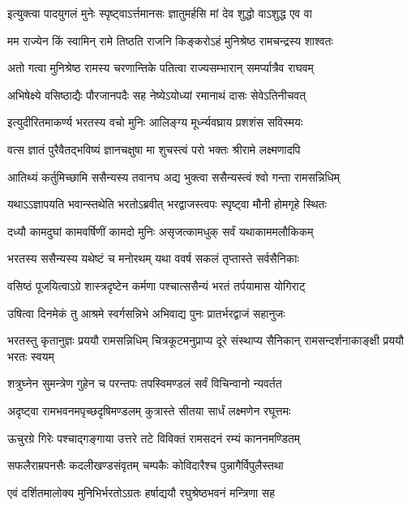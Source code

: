 \twolineshloka
{इत्युक्त्वा पादयुगलं मुनेः स्पृष्ट्वाऽर्त्तमानसः}
{ज्ञातुमर्हसि मां देव शुद्धो वाऽशुद्ध एव वा} %

\twolineshloka
{मम राज्येन किं स्वामिन् रामे तिष्ठति राजनि}
{किङ्करोऽहं मुनिश्रेष्ठ रामचन्द्रस्य शाश्वतः} %

\twolineshloka
{अतो गत्वा मुनिश्रेष्ठ रामस्य चरणान्तिके}
{पतित्वा राज्यसम्भारान् समर्प्यात्रैव राघवम्} %

\twolineshloka
{अभिषेक्ष्ये वसिष्ठाद्यैः पौरजानपदैः सह}
{नेष्येऽयोध्यां रमानाथं दासः सेवेऽतिनीचवत्} %

\twolineshloka
{इत्युदीरितमाकर्ण्य भरतस्य वचो मुनिः}
{आलिङ्ग्य मूर्ध्न्यवघ्राय प्रशशंस सविस्मयः} %

\twolineshloka
{वत्स ज्ञातं पुरैवैतद्भविष्यं ज्ञानचक्षुषा}
{मा शुचस्त्वं परो भक्तः श्रीरामे लक्ष्मणादपि} %

\twolineshloka
{आतिथ्यं कर्तुमिच्छामि ससैन्यस्य तवानघ}
{अद्य भुक्त्वा ससैन्यस्त्वं श्वो गन्ता रामसन्निधिम्} %

\twolineshloka
{यथाऽऽज्ञापयति भवान्स्तथेति भरतोऽब्रवीत्}
{भरद्वाजस्त्वपः स्पृष्ट्वा मौनी होमगृहे स्थितः} %

\twolineshloka
{दध्यौ कामदुघां कामवर्षिणीं कामदो मुनिः}
{असृजत्कामधुक् सर्वं यथाकाममलौकिकम्} %

\twolineshloka
{भरतस्य ससैन्यस्य यथेष्टं च मनोरथम्}
{यथा ववर्ष सकलं तृप्तास्ते सर्वसैनिकाः} %

\twolineshloka
{वसिष्ठं पूजयित्वाऽग्रे शास्त्रदृष्टेन कर्मणा}
{पश्चात्ससैन्यं भरतं तर्पयामास योगिराट्} %

\twolineshloka
{उषित्वा दिनमेकं तु आश्रमे स्वर्गसन्निभे}
{अभिवाद्य पुनः प्रातर्भरद्वाजं सहानुजः} %

\threelineshloka
{भरतस्तु कृतानुज्ञः प्रययौ रामसन्निधिम्}
{चित्रकूटमनुप्राप्य दूरे संस्थाप्य सैनिकान्}
{रामसन्दर्शनाकाङ्क्षी प्रययौ भरतः स्वयम्} %

\twolineshloka
{शत्रुघ्नेन सुमन्त्रेण गुहेन च परन्तपः}
{तपस्विमण्डलं सर्वं विचिन्वानो न्यवर्तत} %

\twolineshloka
{अदृष्ट्वा रामभवनमपृच्छदृषिमण्डलम्}
{कुत्रास्ते सीतया सार्धं लक्ष्मणेन रघूत्तमः} %

\twolineshloka
{ऊचुरग्रे गिरेः पश्चाद्गङ्गाया उत्तरे तटे}
{विविक्तं रामसदनं रम्यं काननमण्डितम्} %

\twolineshloka
{सफलैराम्रपनसैः कदलीखण्डसंवृतम्}
{चम्पकैः कोविदारैश्च पुन्नागैर्विपुलैस्तथा} %

\twolineshloka
{एवं दर्शितमालोक्य मुनिभिर्भरतोऽग्रतः}
{हर्षाद्ययौ रघुश्रेष्ठभवनं मन्त्रिणा सह} %

